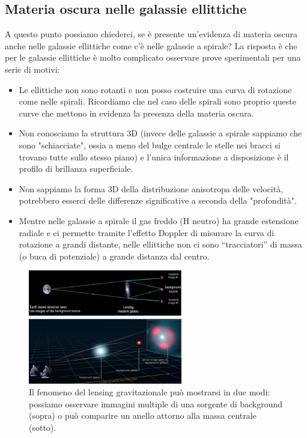 \subsection{Materia oscura nelle galassie ellittiche} \label{sec:materia-oscura-ellittiche}
A questo punto possiamo chiederci, se è presente un'evidenza di materia oscura anche nelle galassie ellittiche come c’è nelle galassie a spirale? La risposta è che per le galassie ellittiche è molto complicato osservare prove sperimentali per una serie di motivi:
\begin{itemize}
    \item Le ellittiche non sono rotanti e non posso costruire una curva di rotazione come nelle spirali. Ricordiamo che nel caso delle spirali sono proprio queste curve che mettono in evidenza la presenza della materia oscura.
    \item Non conosciamo la struttura 3D (invece delle galassie a spirale sappiamo che sono "schiacciate", ossia a meno del bulge centrale le stelle nei bracci si trovano tutte sullo stesso piano) e l’unica informazione a disposizione è il profilo di brillanza superficiale.
    \item Non sappiamo la forma 3D della distribuzione anisotropa delle velocità, potrebbero esserci delle differenze significative a seconda della "profondità".
    \item Mentre nelle galassie a spirale il gas freddo (H neutro) ha grande estensione radiale e ci permette tramite l'effetto Doppler di misurare la curva di rotazione a grandi distante, nelle ellittiche non ci sono “tracciatori” di massa (o buca di potenziale) a grande distanza dal centro.
\end{itemize} 

\begin{figure}
    \centering
    \includegraphics[width=0.6\textwidth]{immagini/gravitational-lensing.png}
    \caption{Il fenomeno del lensing gravitazionale può mostrarsi in due modi: possiamo osservare immagini multiple di una sorgente di background (sopra) o può comparire un anello attorno alla massa centrale (sotto).}
    \label{fig:gravitational-lensing}
\end{figure}

